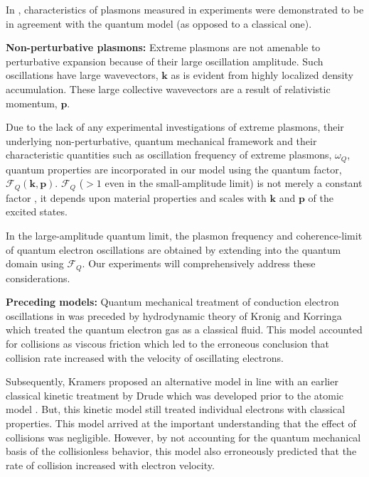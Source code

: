 \documentclass[aps,twocolumn,notitlepage,superscriptaddress]{revtex4-1}
\renewcommand\vec{\mathbf}
\begin{document}
In \cite{Pines-PhysRev-1953}, characteristics of plasmons measured in experiments were demonstrated to be in agreement with the quantum model (as opposed to a classical one).

{\bf Non-perturbative plasmons:} Extreme plasmons are not amenable to perturbative expansion because of their large oscillation amplitude. Such oscillations have large wavevectors, $\vec{k}$ as is evident from highly localized density accumulation. These large collective wavevectors are a result of relativistic momentum, $\vec{p}$.

Due to the lack of any experimental investigations of extreme plasmons, their underlying non-perturbative, quantum mechanical framework and their characteristic quantities such as oscillation frequency of extreme plasmons, $\omega_{Q}$, quantum properties are incorporated in our model using the quantum factor, $\mathscr{F}_Q({\vec{k},\vec{p}})$. $\mathscr{F}_Q$ ($>1$ even in the small-amplitude limit) is not merely a constant factor \cite{Pines-PhysRev-1953}, it depends upon material properties and scales with $\vec{k}$ and $\vec{p}$ of the excited states.

In the large-amplitude quantum limit, the plasmon frequency and coherence-limit of quantum electron oscillations are obtained by extending into the quantum domain using $\mathscr{F}_Q$. Our experiments \cite{plasmonics-ieee-2022, slac-2023, slac-2022, slac-2020} will comprehensively address these considerations.

{\bf Preceding models:} Quantum mechanical treatment of conduction electron oscillations in \cite{Pines-PhysRev-1953} was preceded by hydrodynamic theory of Kronig and Korringa \cite{Kronig-Korringa-1943} which treated the quantum electron gas as a classical fluid. This model accounted for collisions as viscous friction which led to the erroneous conclusion that collision rate increased with the velocity of oscillating electrons.

Subsequently, Kramers proposed an alternative model \cite{Kramers-1947} in line with an earlier classical kinetic treatment by Drude which was developed prior to the atomic model \cite{Drude-1900}. But, this kinetic model still treated individual electrons with classical properties. This model arrived at the important understanding that the effect of collisions was negligible. However, by not accounting for the quantum mechanical basis of the collisionless behavior, this model also erroneously predicted that the rate of collision increased with electron velocity.
\end{document}

